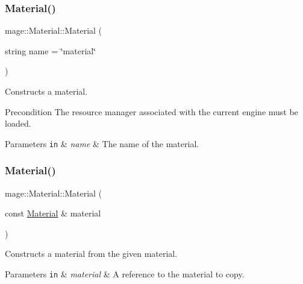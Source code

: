 \subsubsection{\texorpdfstring{Material()}{Material()}\hspace{0.1cm}{\footnotesize\ttfamily [1/3]}}
{\footnotesize\ttfamily mage\+::\+Material\+::\+Material (\begin{DoxyParamCaption}\item[{string}]{name = {\ttfamily \char`\"{}material\char`\"{}} }\end{DoxyParamCaption})\hspace{0.3cm}{\ttfamily [explicit]}}

Constructs a material.

\begin{DoxyPrecond}{Precondition}
The resource manager associated with the current engine must be loaded. 
\end{DoxyPrecond}

\begin{DoxyParams}[1]{Parameters}
\mbox{\tt in}  & {\em name} & The name of the material. \\
\hline
\end{DoxyParams}
\hypertarget{classmage_1_1_material_abed630412cdc4a6281389d128ec4b5f3}{}\label{classmage_1_1_material_abed630412cdc4a6281389d128ec4b5f3} 
\subsubsection{\texorpdfstring{Material()}{Material()}\hspace{0.1cm}{\footnotesize\ttfamily [2/3]}}
{\footnotesize\ttfamily mage\+::\+Material\+::\+Material (\begin{DoxyParamCaption}\item[{const \hyperlink{classmage_1_1_material}{Material} \&}]{material }\end{DoxyParamCaption})\hspace{0.3cm}{\ttfamily [default]}}

Constructs a material from the given material.


\begin{DoxyParams}[1]{Parameters}
\mbox{\tt in}  & {\em material} & A reference to the material to copy. \\
\hline
\end{DoxyParams}
\hypertarget{classmage_1_1_material_a378f529bd1954b81cb2431f40e772adb}{}\label{classmage_1_1_material_a378f529bd1954b81cb2431f40e772adb} 
